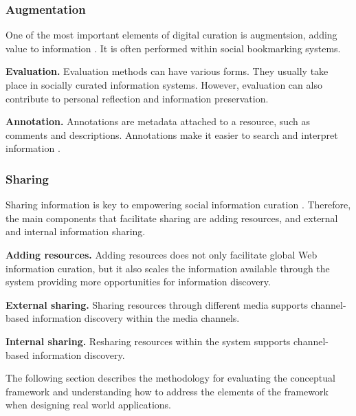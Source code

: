 \documentclass{casconpaper}
\begin{document}
{\subsubsection{Augmentation}
One of the most important elements of digital curation is augmentsion, adding value to information \cite{beagrie, wittaker}. It is often performed within social bookmarking systems.

\textbf{Evaluation.} Evaluation methods can have various forms. They usually take place in socially curated information systems. However, evaluation can also contribute to personal reflection and information preservation. 

\textbf{Annotation.} Annotations are metadata attached to a resource, such as comments and descriptions. Annotations make it easier to search and interpret information . 
} %

{\subsubsection{Sharing}
Sharing information is key to empowering social information curation \cite{beagrie}. Therefore, the main components that facilitate sharing are adding resources, and external and internal information sharing.

\textbf{Adding resources.} Adding resources does not only facilitate global Web information curation, but it also scales the information available through the system providing more opportunities for information discovery.

\textbf{External sharing.} Sharing resources through different media supports channel-based information discovery within the media channels. 

\textbf{Internal sharing.} Resharing resources within the system supports channel-based information discovery. 
 

} %

The following section describes the methodology for evaluating the conceptual framework and understanding how to address the elements of the framework when designing real world applications.
\end{document}
